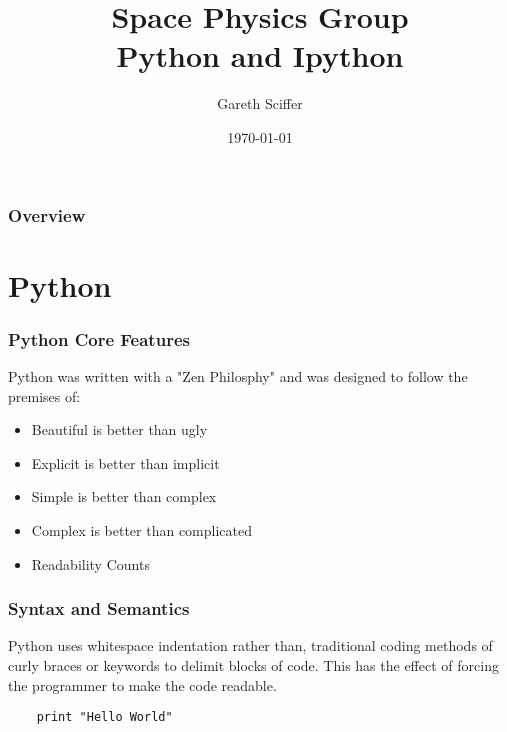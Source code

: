 \documentclass{beamer}
\title[Python and IPython]{Space Physics Group\\Python and Ipython} %
\author{Gareth Sciffer} %
\institute[UON] %
{
   University of Newcastle\\ %
  \medskip
  \textit{Gareth.Sciffer@newcastle.edu.au} %
}
\date{\today} %
\begin{document}
\begin{frame}
  \titlepage %
\end{frame}

\begin{frame}
  \frametitle{Overview} %
  \tableofcontents %
\end{frame}

\section{Python}
\begin{frame}
  \frametitle{Python Core Features}
  Python was written with a "Zen Philosphy" and was designed to follow the
  premises of:
  \begin{itemize}
    \item Beautiful is better than ugly
    \item Explicit is better than implicit
    \item Simple is better than complex
    \item Complex is better than complicated
    \item Readability Counts
  \end{itemize}
\end{frame}
\begin{frame}
  \frametitle{Syntax and Semantics}
  Python uses whitespace indentation rather than, traditional coding methods
  of curly braces or keywords to delimit blocks of code. This has the effect of
  forcing the programmer to make the code readable.
  \lstset{language=Python}
  \begin{lstlisting}
    print "Hello World"
  \end{lstlisting}
\end{frame}
\end{document}
